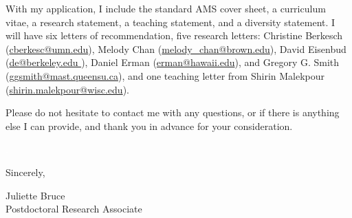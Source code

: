 \documentclass[11pt]{article}
\begin{document}


With my application, I include the standard AMS cover sheet, a curriculum vitae, a research statement, a teaching statement, and a diversity statement. I will have six letters of recommendation, five research letters: Christine Berkesch (\href{mailto:cberkesc@umn.edu}{cberkesc@umn.edu}), Melody Chan (\href{mailto:melody\_chan@brown.edu}{melody\_chan@brown.edu}), David Eisenbud (\href{mailto:de@berkeley.edu }{de@berkeley.edu }), Daniel Erman (\href{mailto:erman@hawaii.edu}{erman@hawaii.edu}), and Gregory G. Smith (\href{mailto:ggsmith@mast.queensu.ca}{ggsmith@mast.queensu.ca}), and one teaching letter from Shirin Malekpour (\href{mailto:shirin.malekpour@wisc.edu}{shirin.malekpour@wisc.edu}).  

Please do not hesitate to contact me with any questions, or if there is anything else I can provide, and thank you in advance for your consideration. 

\vspace{24pt}
\noindent
\begin{minipage}{0.99\textwidth}
\begin{minipage}{0.69\textwidth}
\textcolor{white}{.}
\end{minipage}
\begin{minipage}{0.29\textwidth}
Sincerely, 

\vspace{36pt}
Juliette Bruce\\
Postdoctoral Research Associate\end{minipage}
\end{minipage}

\end{document}

